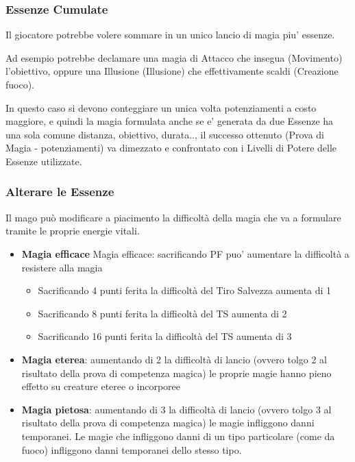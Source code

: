 \documentclass[a4paper,10 pt,twoside,openany]{book}
\begin{document}
\subsubsection{Essenze Cumulate}

Il giocatore potrebbe volere sommare in un unico lancio di magia piu' essenze.

Ad esempio potrebbe declamare una magia di Attacco che insegua (Movimento) l'obiettivo, oppure una Illusione (Illusione) che effettivamente scaldi (Creazione fuoco).


In questo caso si devono conteggiare un unica volta potenziamenti a costo maggiore, e quindi la magia formulata anche se e' generata da due Essenze ha una sola comune distanza, obiettivo, durata.., il successo ottenuto (Prova di Magia - potenziamenti) va dimezzato e confrontato con i Livelli di Potere delle Essenze utilizzate.


\subsubsection{Alterare le Essenze}

\label{alterare-le-essenze}

Il mago può modificare a piacimento la difficoltà della magia che va a formulare tramite le proprie energie vitali.

\begin{itemize}
	\item
	\textbf{Magia efficace}
	Magia efficace: sacrificando PF puo’ aumentare la difficoltà a resistere alla magia
	\begin{itemize}
		\item Sacrificando 4 punti ferita la difficoltà del Tiro Salvezza aumenta di 1
		\item Sacrificando 8 punti ferita la difficoltà del TS aumenta di 2
		\item Sacrificando 16 punti ferita la difficoltà del TS aumenta di 3
	\end{itemize}
\end{itemize}
%
\begin{itemize}
	\item
	\textbf{Magia eterea}: aumentando di 2 la difficoltà di lancio (ovvero tolgo 2 al risultato della prova di competenza magica) le proprie magie hanno pieno effetto su creature eteree o incorporee
\end{itemize}
%
\begin{itemize}
	\item
	\textbf{Magia pietosa}: aumentando di 3 la difficoltà di lancio (ovvero tolgo 3 al risultato della prova di competenza magica) le magie infliggono danni temporanei. Le magie che infliggono danni di un tipo particolare (come da fuoco) infliggono danni temporanei dello stesso tipo.
\end{itemize}
\end{document}
